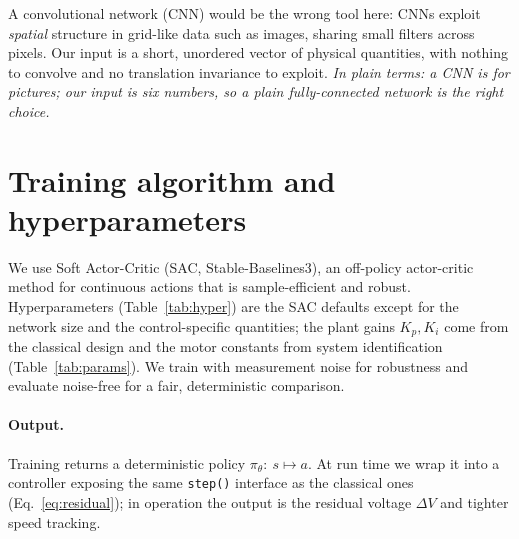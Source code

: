 \documentclass[10pt,twocolumn]{article}
\newcommand{\eli}[1]{\textit{In plain terms: #1}}
\begin{document}
A convolutional network (CNN) would be the wrong tool here: CNNs exploit
\emph{spatial} structure in grid-like data such as images, sharing small
filters across pixels. Our input is a short, unordered vector of
physical quantities, with nothing to convolve and no translation
invariance to exploit.
\eli{a CNN is for pictures; our input is six numbers, so a plain
fully-connected network is the right choice.}

\section{Training algorithm and hyperparameters}
We use Soft Actor-Critic (SAC, Stable-Baselines3), an off-policy
actor-critic method for continuous actions that is sample-efficient and
robust. Hyperparameters (Table~\ref{tab:hyper}) are the SAC defaults
except for the network size and the control-specific quantities; the
plant gains $K_p,K_i$ come from the classical design and the motor
constants from system identification (Table~\ref{tab:params}). We train
with measurement noise for robustness and evaluate noise-free for a
fair, deterministic comparison.

\paragraph{Output.} Training returns a deterministic policy
$\pi_\theta:\ s\mapsto a$. At run time we wrap it into a controller
exposing the same \texttt{step()} interface as the classical ones
(Eq.~\ref{eq:residual}); in operation the output is the residual voltage
$\Delta V$ and tighter speed tracking.
\end{document}
